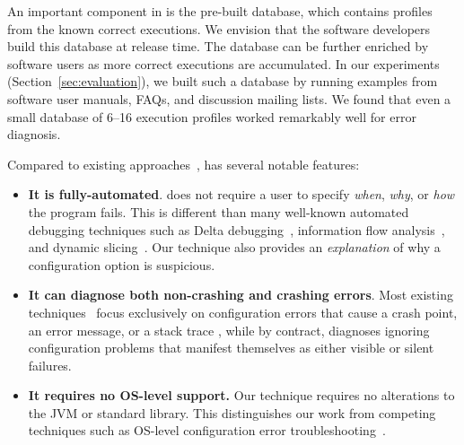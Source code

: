

An important component in \ourtool is the pre-built
database, which contains profiles
from the known correct executions. We envision that 
the software developers build this database at release time.
The database can be
further enriched by software users as more correct
executions are accumulated. 
In our experiments (Section~\ref{sec:evaluation}), we
built such a database by running examples from software
user manuals, FAQs, and discussion mailing lists.  We
found that even a small database of 6--16 execution profiles worked remarkably
well for error diagnosis.

Compared to existing approaches~\cite{Zeller:2002:ICC, Zhang:2003:PDS,
Rabkin:2011:PPC, Whitaker:2004:CDS, Attariyan:2010:ACT, Wang:2004:AMT}, \ourtool has
several notable features:

\begin{itemize}
\item \textbf{It is fully-automated}.
\ourtool does not require a user to specify
\textit{when}, \textit{why}, or \textit{how} the program fails. This is
different than many well-known automated debugging techniques such
as Delta debugging~\cite{Zeller:2002:ICC}, information flow analysis~\cite{Attariyan:2010:ACT},
 and dynamic slicing~\cite{Zhang:2003:PDS}.
Our technique also provides an \emph{explanation} of
why a configuration option is suspicious. 

\item \textbf{It can diagnose both non-crashing and crashing errors}.
Most existing techniques~\cite{Rabkin:2011:PPC,
Whitaker:2004:CDS, Attariyan:2010:ACT} focus exclusively on configuration errors
that cause a crash point, an error message, or a stack trace
, while by contract, \ourtool diagnoses
ignoring configuration problems that manifest themselves as
either visible or silent failures.

\item \textbf{It requires no OS-level support.} Our technique requires no alterations to
the JVM or standard library. This distinguishes our work from
competing techniques such as OS-level configuration
error troubleshooting~\cite{Whitaker:2004:CDS}.%

\end{itemize}

